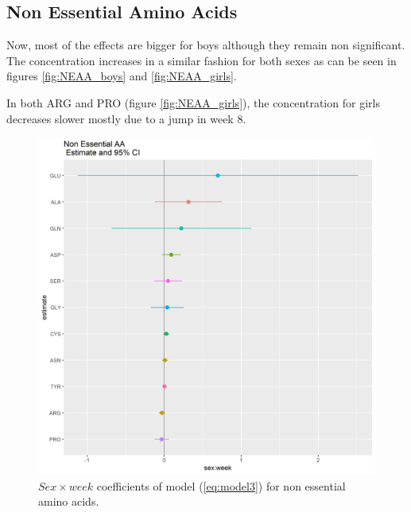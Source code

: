 \documentclass[12pt]{article}
\begin{document}
\subsection{Non Essential Amino Acids}

Now, most of the effects are bigger for boys although they remain non significant. The concentration increases in a similar fashion for both sexes as can be seen in figures \ref{fig:NEAA_boys} and \ref{fig:NEAA_girls}.

In both ARG and PRO (figure \ref{fig:NEAA_girls}), the concentration for girls decreases slower mostly due to a jump in week $8$.

\begin{figure}[!htb]
  \includegraphics[width= \textwidth]{../sexweek/NEAA_SW_SW_coeff.png}
  \caption{$Sex \times week$ coefficients of model (\ref{eq:model3}) for non essential amino acids.}
  \label{fig:NEAA_SW_SW_coeff}
\end{figure}
\end{document}
